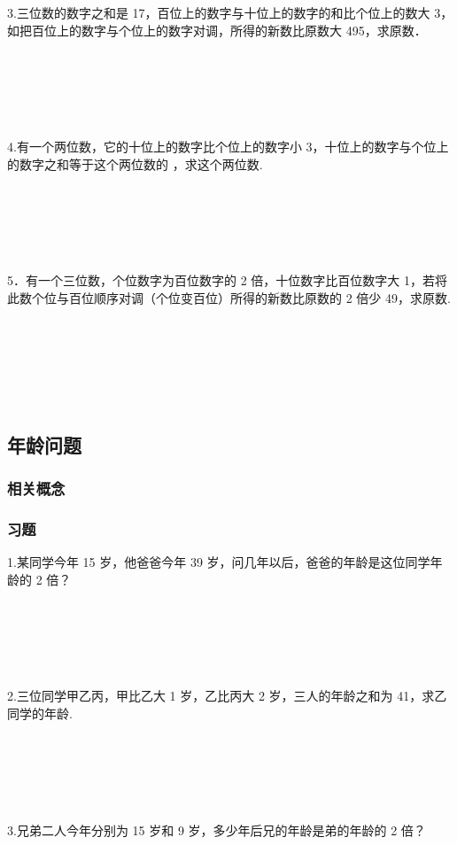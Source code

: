 \documentclass{article}
\begin{document}
~\\
~\\
~\\
~\\
~\\
3.三位数的数字之和是 17，百位上的数字与十位上的数字的和比个位上的数大 3，如把百位上的数字与个位上的数字对调，所得的新数比原数大 495，求原数．

~\\
~\\
~\\
~\\
~\\
4.有一个两位数，它的十位上的数字比个位上的数字小 3，十位上的数字与个位上的数字之和等于这个两位数的 ，求这个两位数.

~\\
~\\
~\\
~\\
~\\
5．有一个三位数，个位数字为百位数字的 2 倍，十位数字比百位数字大 1，若将此数个位与百位顺序对调（个位变百位）所得的新数比原数的 2 倍少 49，求原数.

~\\
~\\
~\\
~\\
~\\
\subsection{年龄问题}
\subsubsection*{相关概念}
\subsubsection*{习题}
1.某同学今年 15 岁，他爸爸今年 39 岁，问几年以后，爸爸的年龄是这位同学年龄的 2 倍？

~\\
~\\
~\\
~\\
~\\
2.三位同学甲乙丙，甲比乙大 1 岁，乙比丙大 2 岁，三人的年龄之和为 41，求乙同学的年龄.

~\\
~\\
~\\
~\\
~\\
3.兄弟二人今年分别为 15 岁和 9 岁，多少年后兄的年龄是弟的年龄的 2 倍？
\end{document}
